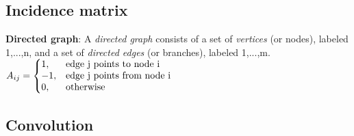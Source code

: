 \subsection{Incidence matrix}
\textbf{Directed graph}: A \textit{directed graph} consists of a set of \textit{vertices} (or nodes), labeled 1,...,n, and a set of \textit{directed edges} (or branches), labeled 1,...,m. \\
$
A_{ij} = \left\{
  \begin{array}{@{}ll@{}}
    1, & \text{edge j points to node i} \\
    -1, & \text{edge j points from node i}\\
    0, & \text{otherwise}
  \end{array}\right.
$\\
\subsection{Convolution}
